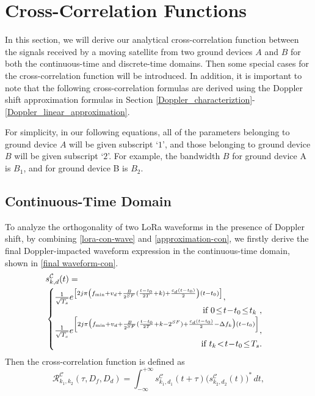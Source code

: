 \documentclass{IEEEtaes}
\theoremstyle{plain}
\begin{document}
\section{Cross-Correlation Functions}\label{Cross-correlation_functions}
In this section, we will derive our analytical cross-correlation function between the signals received by a moving satellite from two ground devices $A$ and $B$ for both the continuous-time and discrete-time domains. Then some special cases for the cross-correlation function will be introduced. In addition, it is important to note that the following cross-correlation formulas are derived using the Doppler shift approximation formulas in Section \ref{Doppler_characteriztion}-\ref{Doppler_linear_approximation}.

For simplicity, in our following equations, all of the parameters belonging to ground device $A$ will be given subscript ‘$1$’, and those belonging to ground device $B$ will be given subscript ‘$2$’. For example, the bandwidth $B$ for ground device A is $B_1$, and for ground device B is $B_2$.
\vspace{-1pt}
\subsection{Continuous-Time Domain}
{To analyze the orthogonality of two LoRa waveforms in the presence of Doppler shift, by combining \eqref{lora-con-wave} and \eqref{approximation-con}, we firstly derive the final Doppler-impacted waveform expression in the continuous-time domain, shown in \eqref{final waveform-con}. }
\begin{equation}
  \label{final waveform-con}
  \begin{aligned} 
    &s^\mathcal{C} _{k,d}(t) =\\ &\begin{cases}
      \frac{1}{\sqrt{T_s}}e^{\left[2j\pi \left( f_{\text{min}}+v_d+\frac{B}{2^{SF}}(\frac{t-t_0}{2T} +k)+\frac{c_d(t-t_0)}{2} \right)(t-t_0)\right]},\\
      \hfill \text{ if $0\!\le\! t\!-\!t_0 \!\le\! t_k$ },\\
      \frac{1}{\sqrt{T_s}}e^{\left[2j\pi \big( f_{\text{min}}+v_d+\frac{B}{2^{SF}}(\frac{t-t_0}{2T} +k-2^{SF})+\frac{c_d(t-t_0)}{2} -\Delta f_k \big)(t-t_0)\right]},\\
      \hfill \text{ if $t_k\!<\!  t\!-\!t_0 \!\le\! T_s$}.
    \end{cases}
  \end{aligned}
\end{equation}
Then the cross-correlation function is defined as
\begin{equation}
  \label{cross-con}
  \mathcal{R}^\mathcal{C} _{k_1,k_2}(\tau,D_f,D_d)=\int_{-\infty}^{+\infty} s^\mathcal{C}_{k_1,d_1}(t+\tau)\Big(s^\mathcal{C}_{k_2,d_2}(t)\Big)^*\, dt,  
\end{equation}
\end{document}
